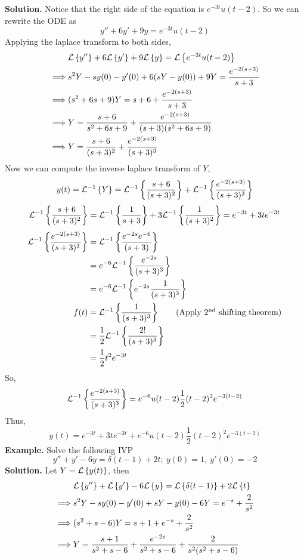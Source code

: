 \documentclass[openany]{report}
\begin{document}
\noindent
\textbf{Solution.} Notice that the right side of the equation is $e^{-3t}u(t-2)$. So we can rewrite the ODE as 
\[y'' + 6y' + 9y = e^{-3t}u(t-2)\]
Applying the laplace transform to both sides, 
\begin{align*}
  &\mathcal{L}\left\{y''\right\} + 6\mathcal{L}\left\{y'\right\} + 9\mathcal{L}\left\{y\right\} = \mathcal{L}\left\{e^{-3t}u(t-2)\right\}\\
  \implies & s^2Y - sy(0) - y'(0) + 6(sY - y(0)) + 9Y= \frac{e^{-2(s+3)}}{s+3}\\
  \implies & (s^2 + 6s + 9)Y =  s + 6 + \frac{e^{-2(s+3)}}{s+3}\\
  \implies & Y = \frac{s+6}{s^2 + 6s + 9} + \frac{e^{-2(s+3)}}{(s+3)(s^2+6s+9)}\\
  \implies & Y = \frac{s+6}{(s+3)^2} + \frac{e^{-2(s+3)}}{(s+3)^3}\\
\end{align*}
Now we can compute the inverse laplace transform of $Y$, 
\[y(t) = \mathcal{L}^{-1}\left\{Y\right\} = \mathcal{L}^{-1}\left\{\frac{s+6}{(s+3)^2}\right\} + \mathcal{L}^{-1}\left\{\frac{e^{-2(s+3)}}{(s+3)^3}\right\}\]
\[\mathcal{L}^{-1}\left\{\frac{s+6}{(s+3)^2}\right\} = \mathcal{L}^{-1}\left\{\frac{1}{s+3}\right\} + 3\mathcal{L}^{-1}\left\{\frac{1}{(s+3)^2}\right\} = e^{-3t} + 3te^{-3t}\]
\begin{align*}
    \ilaplace{\frac{e^{-2(s+3)}}{(s+3)^3}} &= \ilaplace{\frac{e^{-2s}e^{-6}}{(s+3)}}\\
    &= e^{-6}\ilaplace{\frac{e^{-2s}}{(s+3)^3}}\\
    &= e^{-6}\ilaplace{e^{-2s}\frac{1}{(s+3)^3}} \\
    f(t) &= \ilaplace{\frac{1}{(s+3)^3}}\tag{Apply 2\textsuperscript{nd} shifting theorem}\\
    &= \frac{1}{2}\ilaplace{\frac{2!}{(s+3)^3}}\\
    &= \frac{1}{2}t^2e^{-3t}\\
\end{align*}
So, 
\[\mathcal{L}^{-1}\left\{\frac{e^{-2(s+3)}}{(s+3)^3}\right\} = e^{-6}u(t-2)\frac{1}{2}(t-2)^2e^{-3(t-2)}\]
Thus, 
\[y(t) = e^{-3t} + 3te^{-3t} + e^{-6}u(t-2)\frac{1}{2}(t-2)^2e^{-3(t-2)}\]
\noindent
\textbf{Example.} Solve the following IVP 
\[y'' + y' - 6y = \delta(t-1) + 2t; \ y(0) = 1, \ y'(0) = -2\]
\noindent
\textbf{Solution.} Let $Y = \mathcal{L}\left\{y(t)\right\}$, then 
\begin{align*}
    &\mathcal{L}\left\{y''\right\} + \mathcal{L}\left\{y'\right\} - 6\mathcal{L}\left\{y\right\} = \mathcal{L}\left\{\delta(t-1)\right\} + 2\mathcal{L}\left\{t\right\}\\
    \implies& s^2Y - sy(0) - y'(0) + sY - y(0) - 6Y = e^{-s} + \frac{2}{s^2}\\
    \implies& (s^2+s-6)Y = s+1 + e^{-s} + \frac{2}{s^2}\\
    \implies& Y = \frac{s+1}{s^2 + s - 6} + \frac{e^{-2s}}{s^2+s-6} + \frac{2}{s^2(s^2+s-6)}
\end{align*}
\end{document}
